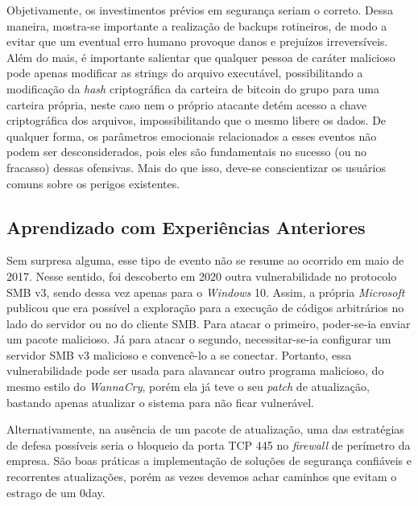 \documentclass[12pt]{article}
\begin{document}
\noindent
Objetivamente, os investimentos prévios em segurança seriam o correto. Dessa maneira, mostra-se importante a realização de backups rotineiros, de modo a evitar que um eventual erro humano provoque danos e prejuízos irreversíveis. Além do mais, é importante salientar que qualquer pessoa de caráter malicioso pode apenas modificar as strings do arquivo executável, possibilitando a modificação da \textit{hash} criptográfica da carteira de bitcoin do grupo para uma carteira própria, neste caso nem o próprio atacante detém acesso a chave criptográfica dos arquivos, impossibilitando que o mesmo libere os dados. De qualquer forma, os parâmetros emocionais relacionados a esses eventos não podem ser desconsiderados, pois eles são fundamentais no sucesso (ou no fracasso) dessas ofensivas. Mais do que isso, deve-se conscientizar os usuários comuns sobre os perigos existentes.

\subsection{Aprendizado com Experiências Anteriores}
Sem surpresa alguma, esse tipo de evento não se resume ao ocorrido em maio de 2017. Nesse sentido, foi descoberto em 2020 outra vulnerabilidade no protocolo SMB v3, sendo dessa vez apenas para o \textit{Windows} 10. Assim, a própria \textit{Microsoft} publicou que era possível a exploração para a execução de códigos arbitrários no lado do servidor ou no do cliente SMB. Para atacar o primeiro, poder-se-ia enviar um pacote malicioso. Já para atacar o segundo, necessitar-se-ia configurar um servidor SMB v3 malicioso e convencê-lo a se conectar.
Portanto, essa vulnerabilidade pode ser usada para alavancar outro programa malicioso, do mesmo estilo do \textit{WannaCry}, porém ela já teve o seu \textit{patch} de atualização, bastando apenas atualizar o sistema para não ficar vulnerável.

\noindent
Alternativamente, na ausência de um pacote de atualização, uma das estratégias de defesa possíveis seria o bloqueio da porta TCP 445 no \textit{firewall} de perímetro da empresa. São boas práticas a implementação de soluções de segurança confiáveis e recorrentes atualizações, porém as vezes devemos achar caminhos que evitam o estrago de um 0day. 
\end{document}
